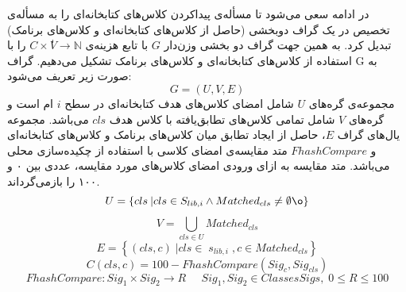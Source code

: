 در ادامه سعی می‌شود تا مسأله‌ی پیداکردن کلاس‌های کتابخانه‌ای را به مسأله‌ی تخصیص در یک گراف دوبخشی (حاصل از کلاس‌های کتابخانه‌ای و کلاس‌های برنامک) تبدیل کرد. به همین جهت گراف دو بخشی وزن‌دار  $G$ با تابع هزینه‌ی
 $C\times  ٰV \rightarrow \mathbb{N}$ 
 را با استفاده از کلاس‌های کتابخانه‌ای و کلاس‌های برنامک تشکیل می‌دهیم. گراف G به صورت زیر تعریف می‌شود:
   \begin{equation}
 	G = (U,V,E)
 \end{equation}
 مجموعه‌ی گره‌های $U$ شامل امضای کلاس‌های هدف کتابخانه‌ای در سطح $i$ ام است و گره‌های $V$ شامل تمامی کلاس‌ها‌ی تطابق‌یافته با کلاس هدف $cls$ می‌باشد. مجموعه یال‌های گراف  $E$، حاصل از ایجاد تطابق میان‌ کلاس‌های برنامک و کلاس‌های کتابخانه‌ای و $FhashCompare$ متد مقایسه‌ی امضای کلاسی با استفاده از چکیده‌سازی محلی می‌باشد. متد مقایسه به ازای ورودی امضای کلاس‌های مورد مقایسه، عددی بین ۰ و ۱۰۰ را بازمی‌گرداند.
\begin{equation}
 	U = \left \{ cls \:| cls \in S_{lib,i} \wedge Matched_{cls} \neq \emptyset \o   \right \}
\end{equation}
\begin{equation}
	V = \bigcup_{cls \in U}^{} Matched_{cls}
\end{equation}
\begin{equation}
E= \left \{ (cls,c)\; | cls \in \; s_{lib,i} \; , c \in Matched_{cls} \right \}
\end{equation}
\begin{equation}
	C(cls,c) = 100 - FhashCompare(Sig_{c} , Sig_{cls})
\end{equation}
\begin{equation}
	FhashCompare: Sig_{1} \times Sig_{2} \rightarrow R \;\;\;\;\; Sig_{1} , Sig_{2} \in ClassesSigs, \; 0 \leq R \leq 100
\end{equation}

